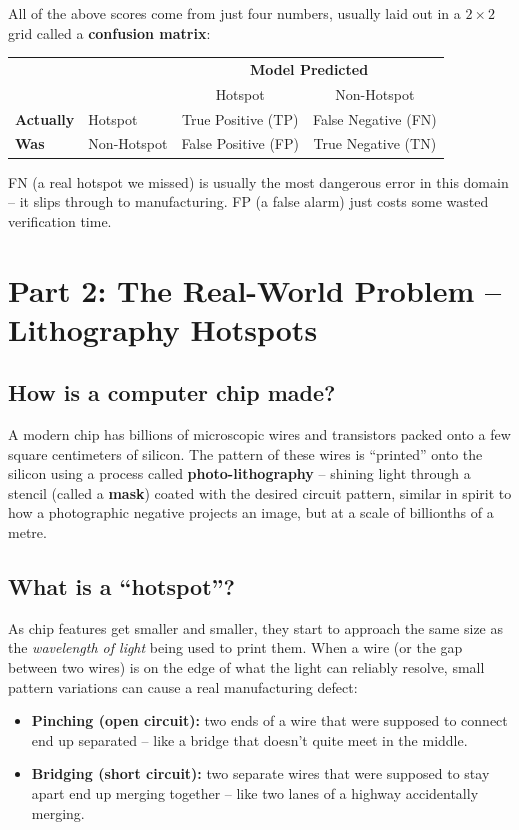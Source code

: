 \documentclass[11pt]{article}
\begin{document}
\begin{keyidea}
All of the above scores come from just four numbers, usually laid out
in a $2\times2$ grid called a \textbf{confusion matrix}:
\begin{center}
\begin{tabular}{ll|c|c}
 & & \multicolumn{2}{c}{\textbf{Model Predicted}} \\
 & & Hotspot & Non-Hotspot \\ \hline
\textbf{Actually} & Hotspot & True Positive (TP) & False Negative (FN) \\
\textbf{Was} & Non-Hotspot & False Positive (FP) & True Negative (TN) \\
\end{tabular}
\end{center}
FN (a real hotspot we missed) is usually the most dangerous error in
this domain -- it slips through to manufacturing. FP (a false alarm)
just costs some wasted verification time.
\end{keyidea}

\section{Part 2: The Real-World Problem -- Lithography Hotspots}

\subsection{How is a computer chip made?}
A modern chip has billions of microscopic wires and transistors
packed onto a few square centimeters of silicon. The pattern of these
wires is ``printed'' onto the silicon using a process called
\textbf{photo-lithography} -- shining light through a stencil (called
a \textbf{mask}) coated with the desired circuit pattern, similar in
spirit to how a photographic negative projects an image, but at a
scale of billionths of a metre.

\subsection{What is a ``hotspot''?}
As chip features get smaller and smaller, they start to approach the
same size as the \emph{wavelength of light} being used to print them.
When a wire (or the gap between two wires) is on the edge of what the
light can reliably resolve, small pattern variations can cause a real
manufacturing defect:

\begin{itemize}[leftmargin=1.2em]
    \item \textbf{Pinching (open circuit):} two ends of a wire that
    were supposed to connect end up separated -- like a bridge that
    doesn't quite meet in the middle.
    \item \textbf{Bridging (short circuit):} two separate wires that
    were supposed to stay apart end up merging together -- like two
    lanes of a highway accidentally merging.
\end{itemize}
\end{document}
